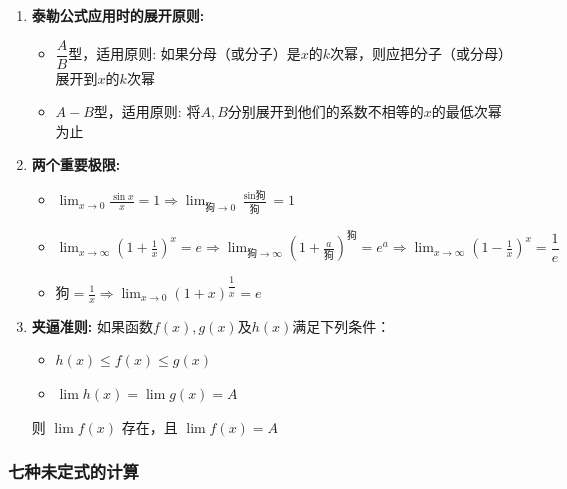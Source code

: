 \documentclass[../book.tex]{subfiles}
\begin{document}
\begin{enumerate}
        \item \textbf{泰勒公式应用时的展开原则:}
        \begin{itemize}
            \item $\dfrac{A}{B}$型，适用{}原则: 如果分母（或分子）是$x$的$k$次幂，则应把分子（或分母）展开到$x$的$k$次幂
            \item $A - B$型，适用{}原则: 将$A, B$分别展开到他们的系数不相等的$x$的最低次幂为止
        \end{itemize}
        \item \textbf{两个重要极限:}
        \begin{itemize}
            \item $\displaystyle \lim_{x\to 0} \frac{\sin x}{x} = 1
            \Rightarrow \lim_{\text{狗}\to 0} \frac{\sin \text{狗}}{\text{狗}} = 1$
            \item $\displaystyle \lim_{x\to \infty} \left(1 + \frac{1}{x}\right)^x = e
            \Rightarrow \lim_{\text{狗}\to \infty} \left(1 + \frac{a}{\text{狗}}\right)^\text{狗} = e^a
            \Rightarrow \displaystyle \lim_{x\to \infty} \left(1 - \frac{1}{x}\right)^x = \dfrac{1}{e}$
            \item $\displaystyle \text{狗} = \frac{1}{x} \Rightarrow \lim_{x\to 0} (1+x)^{\dfrac{1}{x}} = e$
        \end{itemize}
        \item \textbf{夹逼准则:} 如果函数$f(x), g(x)$及$h(x)$满足下列条件：
        \begin{itemize}
            \item $h(x) \leq f(x) \leq g(x)$
            \item $\displaystyle \lim h(x) = \lim g(x) = A$
        \end{itemize}
        则 $\displaystyle \lim f(x)$ 存在，且 $\displaystyle \lim f(x) = A$
    \end{enumerate}

    \subsubsection{七种未定式的计算}
\end{document}
